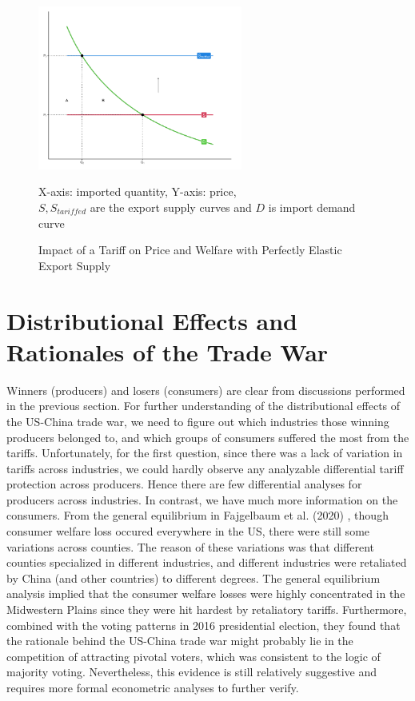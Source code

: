 \documentclass[12pt]{article}
\begin{document}
\begin{figure}[H]
    \centering
    \includegraphics[width = 0.6\textwidth]{tariff_welfare_flat.png}
    \caption{Impact of a Tariff on Price and Welfare with Perfectly Elastic Export Supply}
    {\footnotesize X-axis: imported quantity, Y-axis: price, \\ 
    $S, S_{tariffed}$ are the export supply curves and $D$ is import demand curve \par}
    \label{tariff_welfare_flat}
\end{figure}


\section{Distributional Effects and Rationales of the Trade War}
\label{sec:distributional}
Winners (producers) and losers (consumers) are clear from discussions performed in the previous section.
For further understanding of the distributional effects of the US-China trade war, we need to figure out which industries those winning producers belonged to, and which groups of consumers suffered the most from the tariffs. 
Unfortunately, for the first question, since there was a lack of variation in tariffs across industries, 
we could hardly observe any analyzable differential tariff protection across producers. Hence there are few differential analyses for producers across industries. 
In contrast, we have much more information on the consumers. 
From the general equilibrium in Fajgelbaum et al. (2020) \cite{fajgelbaum2020return}, 
though consumer welfare loss occured everywhere in the US, there were still some variations across counties. 
The reason of these variations was that different counties specialized in different industries, 
and different industries were retaliated by China (and other countries) to different degrees.
The general equilibrium analysis implied that the consumer welfare losses were highly concentrated in the Midwestern Plains since they were hit hardest by retaliatory tariffs.
Furthermore, combined with the voting patterns in 2016 presidential election, 
they found that the rationale behind the US-China trade war might probably lie in the competition of attracting pivotal voters, which was consistent to the logic of majority voting.
Nevertheless, this evidence is still relatively suggestive and requires more formal econometric analyses to further verify.
\end{document}

